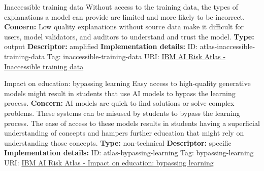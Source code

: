 \documentclass[a4paper,12pt]{article}
\begin{document}
\begin{definitionbox}{Inaccessible training data}
Without access to the training data, the types of explanations a model can provide are limited and more likely to be incorrect.\newline\newline
\textbf{Concern: }Low quality explanations without source data make it difficult for users, model validators, and auditors to understand and trust the model.\newline\newline
\textbf{Type: }output\newline
\textbf{Descriptor: }amplified \newline\newline
\textbf{Implementation details: } \newline
ID: atlas-inaccessible-training-data \newline
Tag: inaccessible-training-data \newline
URI:  \href{https://www.ibm.com/docs/en/watsonx/saas?topic=SSYOK8/wsj/ai-risk-atlas/inaccessible-training-data.html}{IBM AI Risk Atlas - Inaccessible training data}\newline
\end{definitionbox}
\begin{definitionbox}{Impact on education: bypassing learning}
Easy access to high-quality generative models might result in students that use AI models to bypass the learning process.\newline\newline
\textbf{Concern: }AI models are quick to find solutions or solve complex problems. These systems can be misused by students to bypass the learning process. The ease of access to these models results in students having a superficial understanding of concepts and hampers further education that might rely on understanding those concepts.\newline\newline
\textbf{Type: }non-technical\newline
\textbf{Descriptor: }specific \newline\newline
\textbf{Implementation details: } \newline
ID: atlas-bypassing-learning \newline
Tag: bypassing-learning \newline
URI:  \href{https://www.ibm.com/docs/en/watsonx/saas?topic=SSYOK8/wsj/ai-risk-atlas/bypassing-learning.html}{IBM AI Risk Atlas - Impact on education: bypassing learning}\newline
\end{definitionbox}
\end{document}

